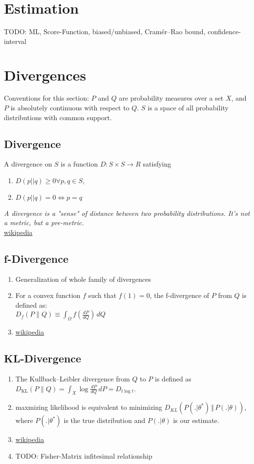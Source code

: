 \section{Estimation}
TODO: ML, Score-Function, biased/unbiased, Cramér–Rao bound, confidence-interval

\section{Divergences}
Conventions for this section: $P$ and $Q$ are probability measures over a set $X$, and $P$ is absolutely continuous with respect to $Q$. $S$ is a space of all probability distributions with common support.
\subsection{Divergence}
A divergence on $S$ is a function $D: S \times S \rightarrow R$ satisfying
\begin{enumerate}
	\item $D(p || q) \geq 0  \forall p, q \in S$,
	\item $D(p || q) = 0 \Leftrightarrow p = q$
\end{enumerate}
\textit{A divergence is a "sense" of distance between two probability distributions. It's not a metric, but a pre-metric.}\\
\href{https://en.wikipedia.org/wiki/Divergence_(statistics)}{wikipedia}

\subsection{f-Divergence}
\begin{enumerate}
	\item Generalization of whole family of divergences
	\item For a convex function $f$ such that $f(1) = 0$, the f-divergence of $P$ from $Q$ is defined as:\\
	$D_{f}(P\parallel Q)\equiv \int _{{\Omega }}f\left({\frac{dP}{dQ}}\right)\,dQ$
	\item \href{https://en.wikipedia.org/wiki/Divergence_(statistics)}{wikipedia}
\end{enumerate}

\subsection{KL-Divergence}
\begin{enumerate}
	\item The Kullback–Leibler divergence from $Q$ to $P$ is defined as\\
	$D_{\mathrm {KL} }(P\|Q)=\int _{X}\log {\frac {dP}{dQ}}\,dP=D_{t\log t}$.
	\item maxmizing likelihood is equivalent to minimizing $D_{KL}(P(. \vert \theta^{\ast}) \, \Vert \, P(. \vert \theta))$, where $P(. \vert \theta^{\ast})$ is the true distribution and $P(. \vert \theta)$ is our estimate.
	\item \href{https://en.wikipedia.org/wiki/Kullback–Leibler_divergence}{wikipedia}
	\item TODO: Fisher-Matrix infitesimal relationship
\end{enumerate}

